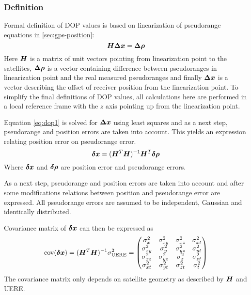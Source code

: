 \subsubsection{Definition}
Formal definition of DOP values is based on linearization of pseudorange equations
in \cref{sec:gps-position}:
\begin{equation}
	\label{eq:dop1}
	\bm{H}\bm{\Delta x} = \bm{\Delta \rho}
\end{equation}
Here \(\bm{H}\) is a matrix of unit vectors pointing from linearization point
to the satellites, \(\bm{\Delta \rho}\) is a vector containing difference between
pseudoranges in linearization point and the real measured pseudoranges and finally
\(\bm{\Delta x}\) is a vector describing the offset of receiver position from the
linearization point.
To simplify the final definitions of DOP values, all calculations here are performed
in a local reference frame with the \(z\) axis pointing up from the linearization point.

Equation \eqref{eq:dop1} is solved for \(\bm{\Delta x}\) using least squares and
as a next step, pseudorange and position errors are taken into account.
This yields an expression relating position error on pseudorange error.
\begin{equation}
	\bm{\delta x} = (\bm{H}^T \bm{H})^{-1} \bm{H}^T \bm{\delta \rho}
\end{equation}
Where \(\bm{\delta x}\) and \(\bm{\delta \rho}\) are position error and pseudorange errors.

As a next step, pseudorange and position errors are taken into account and after
some modifications relations between position and pseudorange error are expressed.
All pseudorange errors are assumed to be independent, Gaussian and identically distributed.

Covariance matrix of \(\bm{\delta x}\) can then be expressed as
\begin{equation}
	\operatorname{\mathrm{cov}}(\bm{\delta x}) =
		(\bm{H}^T \bm{H})^{-1} \sigma^2_{\mathrm{UERE}} =
		\begin{pmatrix}
			\sigma^2_{x}  & \sigma^2_{xy} & \sigma^2_{xz} & \sigma^2_{xt} \\
			\sigma^2_{xy} & \sigma^2_{y}  & \sigma^2_{yz} & \sigma^2_{yt} \\
			\sigma^2_{xz} & \sigma^2_{yz} & \sigma^2_{z}  & \sigma^2_{zt} \\
			\sigma^2_{xt} & \sigma^2_{yt} & \sigma^2_{zt} & \sigma^2_{t}
		\end{pmatrix}
\end{equation}
The covariance matrix only depends on satellite geometry as described by \(\bm{H}\) and UERE.

